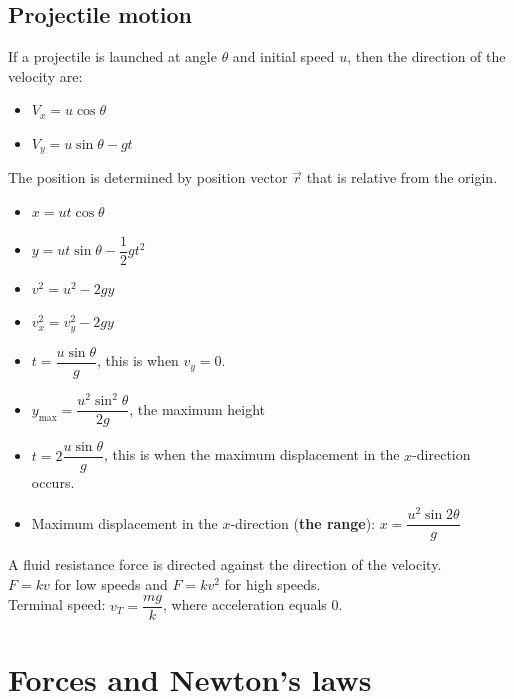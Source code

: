 \documentclass[a4paper,12pt]{article}
\begin{document}
\subsection{Projectile motion}
If a projectile is launched at angle $\theta$ and initial speed $u$, then the direction of the velocity are:
\begin{itemize}
  \item $V_x=u\cos\theta$
  \item $V_y=u\sin\theta-gt$
\end{itemize}
The position is determined by position vector $\vec{r}$ that is relative from the origin.
\begin{itemize}
  \item $x=ut\cos\theta$
  \item $y=ut\sin\theta-\dfrac{1}{2}gt^2$
  \item $v^2=u^2-2gy$
  \item $v_x^2=v_y^2-2gy$
  \item $t=\dfrac{u\sin\theta}{g}$, this is when $v_y=0$.
  \item $y_{\text{max}}=\dfrac{u^2\sin^2\theta}{2g}$, the maximum height
  \item $t=2\dfrac{u\sin\theta}{g}$, this is when the maximum displacement in the $x$-direction occurs.
  \item Maximum displacement in the $x$-direction (\textbf{the range}): $x=\dfrac{u^2\sin 2\theta}{g}$
\end{itemize}
A fluid resistance force is directed against the direction of the velocity.\\
$F=kv$ for low speeds and $F=kv^2$ for high speeds.\\
Terminal speed: $v_T=\dfrac{mg}{k}$, where acceleration equals 0.
\section{Forces and Newton's laws}
\end{document}
